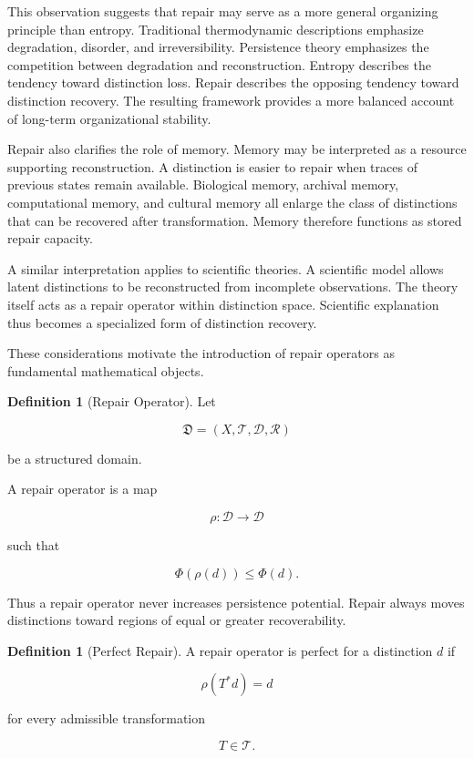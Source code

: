 \documentclass[12pt,oneside]{article}
\theoremstyle{definition}
\newtheorem{definition}[theorem]{Definition} \newtheorem{axiom}[theorem]{Axiom} \newtheorem{remark}[theorem]{Remark} \newtheorem{example}[theorem]{Example}
\begin{document}
This observation suggests that repair may serve as a more general organizing principle than entropy. Traditional thermodynamic descriptions emphasize degradation, disorder, and irreversibility. Persistence theory emphasizes the competition between degradation and reconstruction. Entropy describes the tendency toward distinction loss. Repair describes the opposing tendency toward distinction recovery. The resulting framework provides a more balanced account of long-term organizational stability.

Repair also clarifies the role of memory. Memory may be interpreted as a resource supporting reconstruction. A distinction is easier to repair when traces of previous states remain available. Biological memory, archival memory, computational memory, and cultural memory all enlarge the class of distinctions that can be recovered after transformation. Memory therefore functions as stored repair capacity.

A similar interpretation applies to scientific theories. A scientific model allows latent distinctions to be reconstructed from incomplete observations. The theory itself acts as a repair operator within distinction space. Scientific explanation thus becomes a specialized form of distinction recovery.

These considerations motivate the introduction of repair operators as fundamental mathematical objects.

\begin{definition}[Repair Operator]

Let

\[
\mathfrak D
=
(X,\mathcal T,\mathcal D,\mathcal R)
\]

be a structured domain.

A repair operator is a map

\[
\rho:\mathcal D\rightarrow\mathcal D
\]

such that

\[
\Phi(\rho(d))
\le
\Phi(d).
\]

\end{definition}

Thus a repair operator never increases persistence potential. Repair always moves distinctions toward regions of equal or greater recoverability.

\begin{definition}[Perfect Repair]

A repair operator is perfect for a distinction \(d\) if

\[
\rho(T^*d)=d
\]

for every admissible transformation

\[
T\in\mathcal T.
\]

\end{definition}
\end{document}
